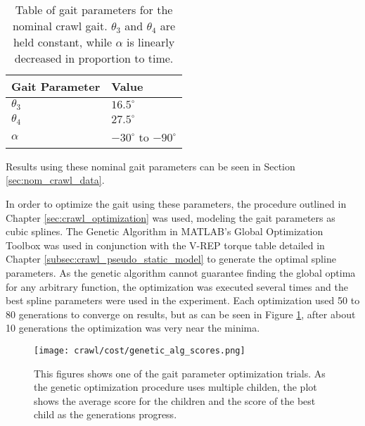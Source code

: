 \begin{table}
  \centering
  \begin{tabularx}{0.5\textwidth}{|l||X|}
    \hline
    \textbf{Gait Parameter} & \textbf{Value}                \\  \hline\hline
    $\theta_3$              &   $16.5^\circ$                \\ 
    $\theta_4$              &   $27.5^\circ$                \\  
    $\alpha$                &   $-30^\circ$ to $-90^\circ$  \\  \hline
  \end{tabularx} 
  
  \caption{Table of gait parameters for the nominal crawl gait. $\theta_3$ and $\theta_4$
           are held constant, while $\alpha$ is linearly decreased in proportion to time.}
  \label{tab:nominal_parameters}
\end{table}

Results using these nominal gait parameters can be seen in Section \ref{sec:nom_crawl_data}.


In order to optimize the gait using these parameters, the procedure outlined in Chapter 
\ref{sec:crawl_optimization} was used, modeling the gait parameters as cubic splines.
The Genetic Algorithm in MATLAB's Global Optimization Toolbox was used in conjunction
with the V-REP torque table detailed in Chapter \ref{subsec:crawl_pseudo_static_model}
to generate the optimal spline parameters. 
As the genetic algorithm cannot guarantee finding the global optima for any arbitrary function,
the optimization was executed several times and the best spline parameters were used
in the experiment. Each optimization used 50 to 80 generations to converge on results,
but as can be seen in Figure \ref{fig:ga_generations}, after about 10 generations the
optimization was very near the minima.

\begin{figure}
  \centering
  \texttt{[image: crawl/cost/genetic\_alg\_scores.png]}
  \caption{This figures shows one of the gait parameter optimization trials.
           As the genetic optimization procedure uses multiple childen, the 
           plot shows the average score for the children and the score of the best
           child as the generations progress.}
  \label{fig:ga_generations}
\end{figure}

